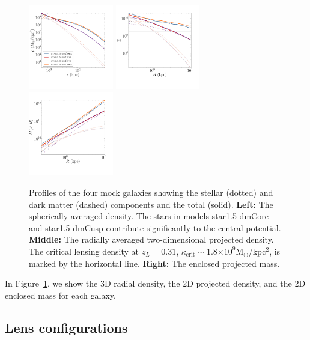 \documentclass[galley,usenatbib]{mn2e}
\newcommand{\Msun}{\ensuremath{\mathrm{M}_\odot}}
\newcommand{\figref}[1] {Figure~\ref{#1}}
\newcommand{\e}[1]{\ensuremath{\times 10^{#1}}}
\newcommand{\mockBB}{{\sc star1.5-dmCore}}
\newcommand{\mockBC}{{\sc star1.5-dmCusp}}
\begin{document}
\begin{figure}
\includegraphics[width=0.33\textwidth]{MockGalProfile-a.pdf} 
\includegraphics[width=0.33\textwidth]{MockGalProfile-b.pdf} 
\includegraphics[width=0.33\textwidth]{MockGalProfile-c.pdf}
\caption{
Profiles of the four mock galaxies showing the stellar (dotted) and dark matter (dashed) components and the total (solid).
\textbf{Left:} 
The spherically averaged density. The stars in models \mockBB{} and \mockBC{} contribute significantly to the central potential. 
\textbf{Middle:} 
The radially averaged two-dimensional projected density.
The critical lensing density at $z_L=0.31$, $\kappa_\mathrm{crit}\sim 1.8\e{9}$\Msun/kpc$^2$, is marked by the horizontal line. 
\textbf{Right:}
The enclosed projected mass.
}
\label{mock galaxies}
\end{figure}

In \figref{mock galaxies}, we show the 3D radial density, the 2D projected
density, and the 2D enclosed mass for each galaxy.

\subsection{Lens configurations}\label{sec:lensconfig}
\end{document}
